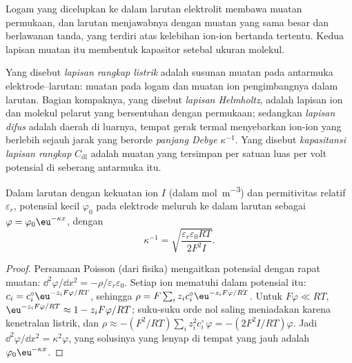Logam yang dicelupkan ke dalam larutan elektrolit membawa muatan permukaan,
dan larutan menjawabnya dengan muatan yang sama besar dan berlawanan tanda,
yang terdiri atas kelebihan ion-ion bertanda tertentu. Kedua lapisan muatan itu
membentuk kapasitor setebal ukuran molekul.

\begin{definition}\label{def:b3:electrode-kinetics:double-layer}
Yang disebut \emph{lapisan rangkap listrik}
adalah susunan muatan pada antarmuka elektrode--larutan: muatan pada logam dan
muatan ion pengimbangnya dalam larutan. Bagian kompaknya, yang disebut
\emph{lapisan Helmholtz}, adalah lapisan ion dan
molekul pelarut yang bersentuhan dengan permukaan; sedangkan \emph{lapisan
difus} adalah daerah di luarnya, tempat gerak termal
menyebarkan ion-ion yang berlebih sejauh jarak yang berorde \emph{panjang
Debye} $\kappa^{-1}$. Yang disebut \emph{kapasitansi
lapisan rangkap} $C_{\mathrm{dl}}$ adalah
muatan yang tersimpan per satuan luas per volt potensial di seberang
antarmuka itu.
\end{definition}

\begin{proposition}\label{prop:b3:electrode-kinetics:debye-length}
Dalam larutan dengan kekuatan ion $I$ (dalam \unit{mol.m^{-3}}) dan permitivitas
relatif $\varepsilon_r$, potensial kecil $\varphi_0$ pada elektrode meluruh ke dalam
larutan sebagai $\varphi = \varphi_0\eu^{-\kappa x}$, dengan
\[
  \kappa^{-1} = \sqrt{\frac{\varepsilon_r\varepsilon_0RT}{2F^2I}} .
\]
\end{proposition}

\begin{proof}
Persamaan Poisson (dari fisika) mengaitkan potensial dengan rapat muatan:
$\dd^2\varphi/\dd x^2 = -\rho/\varepsilon_r\varepsilon_0$. Setiap ion mematuhi  dalam potensial itu: $c_i = c_i^{\circ}\eu^{-z_iF\varphi/RT}$, sehingga
$\rho = F\sum_iz_ic_i^{\circ}\eu^{-z_iF\varphi/RT}$. Untuk $F\varphi \ll RT$,
$\eu^{-z_iF\varphi/RT} \approx 1 - z_iF\varphi/RT$; suku-suku orde nol saling meniadakan
karena kenetralan listrik, dan $\rho \approx -(F^2/RT)\sum_iz_i^2c_i^{\circ}\,\varphi = -(2F^2I/RT)\varphi$.
Jadi $\dd^2\varphi/\dd x^2 = \kappa^2\varphi$, yang solusinya yang lenyap di tempat yang
jauh adalah $\varphi_0\eu^{-\kappa x}$.
\end{proof}

